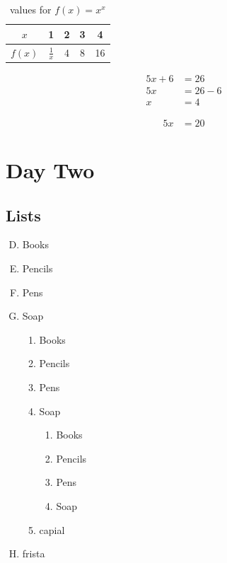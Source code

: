 \documentclass[11px, a4paper]{article}
\begin{document}
\begin{table}[H]
    \centering
    \def\arraystretch{1.5}
    \begin{tabular}{|c||c|c|c|c|}
        \hline
        $x$    & 1             & 2 & 3 & 4  \\ \hline
        $f(x)$ & $\frac{1}{x}$ & 4 & 8 & 16 \\ \hline
    \end{tabular}
    \caption{values for $f(x) = x^x$}
\end{table}

\begin{align}
    5x + 6 & = 26     \\
    5x     & = 26 - 6 \\
    x      & = 4
\end{align}

\begin{align*}
    5x & = 20
\end{align*}
\section{Day Two}
\subsection{Lists}

\begin{enumerate}[A.]\setcounter{enumi}{3}
    \item Books
    \item Pencils
    \item Pens
    \item Soap
          \begin{enumerate}[1)]
              \item Books
              \item Pencils
              \item Pens
              \item Soap
                    \begin{enumerate}
                        \item Books
                        \item Pencils
                        \item Pens
                        \item Soap

                    \end{enumerate}
              \item capial
          \end{enumerate}
    \item frista
\end{enumerate}
\vspace{2cm}
\end{document}
